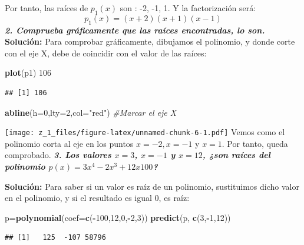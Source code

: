 \documentclass[12pt,]{krantz}
\newenvironment{Shaded}{\begin{snugshade}}{\end{snugshade}}
\newcommand{\CommentTok}[1]{\textcolor[rgb]{0.37,0.37,0.37}{\textit{#1}}}
\newcommand{\DataTypeTok}[1]{\textcolor[rgb]{0.27,0.27,0.27}{#1}}
\newcommand{\DecValTok}[1]{\textcolor[rgb]{0.06,0.06,0.06}{#1}}
\newcommand{\KeywordTok}[1]{\textcolor[rgb]{0.27,0.27,0.27}{\textbf{#1}}}
\newcommand{\NormalTok}[1]{#1}
\newcommand{\OperatorTok}[1]{\textcolor[rgb]{0.43,0.43,0.43}{\textbf{#1}}}
\newcommand{\StringTok}[1]{\textcolor[rgb]{0.5,0.5,0.5}{#1}}
\theoremstyle{definition}
\theoremstyle{definition}
\theoremstyle{definition}
\theoremstyle{remark}
\begin{document}
Por tanto, las raíces de \(p_1(x)\) son : -2, -1, 1.
Y la factorización será:
\[ p_1(x)= (x+2)(x+1)(x-1)\]
\textbf{\emph{2. Comprueba gráficamente que las raíces encontradas, lo son. }}
\textbf{Solución:}
Para comprobar gráficamente, dibujamos el polinomio, y donde corte con el eje X, debe de
coincidir con el valor de las raíces:

\begin{Shaded}
\begin{Highlighting}[]
\KeywordTok{plot}\NormalTok{(p1)}
\DecValTok{106}
\end{Highlighting}
\end{Shaded}

\begin{verbatim}
## [1] 106
\end{verbatim}

\begin{Shaded}
\begin{Highlighting}[]
\KeywordTok{abline}\NormalTok{(}\DataTypeTok{h=}\DecValTok{0}\NormalTok{,}\DataTypeTok{lty=}\DecValTok{2}\NormalTok{,}\DataTypeTok{col=}\StringTok{"red"}\NormalTok{) }\CommentTok{#Marcar el eje X}
\end{Highlighting}
\end{Shaded}

\texttt{[image: z\_1\_files/figure-latex/unnamed-chunk-6-1.pdf]}
Vemos como el polinomio corta al eje en los puntos \(x=-2, x=-1\) y \(x=1\). Por tanto, queda
comprobado.
\textbf{\emph{3. Los valores \(x=3\), \(x=-1\) y \(x=12\), ¿son raíces del polinomio \(p(x)=3x^4-2x^3+12x100\)? }}

\textbf{Solución:}
Para saber si un valor es raíz de un polinomio, sustituimos dicho valor en el polinomio, y si el
resultado es igual 0, es raíz:

\begin{Shaded}
\begin{Highlighting}[]
\NormalTok{p=}\KeywordTok{polynomial}\NormalTok{(}\DataTypeTok{coef=}\KeywordTok{c}\NormalTok{(}\OperatorTok{-}\DecValTok{100}\NormalTok{,}\DecValTok{12}\NormalTok{,}\DecValTok{0}\NormalTok{,}\OperatorTok{-}\DecValTok{2}\NormalTok{,}\DecValTok{3}\NormalTok{))}
\KeywordTok{predict}\NormalTok{(p, }\KeywordTok{c}\NormalTok{(}\DecValTok{3}\NormalTok{,}\OperatorTok{-}\DecValTok{1}\NormalTok{,}\DecValTok{12}\NormalTok{))}
\end{Highlighting}
\end{Shaded}

\begin{verbatim}
## [1]   125  -107 58796
\end{verbatim}
\end{document}
